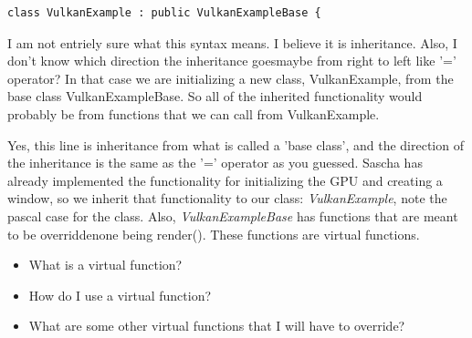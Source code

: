 \documentclass{article}
\begin{document}
\begin{verbatim}
class VulkanExample : public VulkanExampleBase {
\end{verbatim}
\begin{tcolorbox}[
  enhanced,
  breakable,
  colback=orange!5,
  colframe=orange!75!black,
  colbacktitle=orange!15,
  coltitle=black,
  fonttitle=\bfseries,
  sharp corners=all,
  boxrule=0.8pt,
  left=5pt,
  right=5pt,
  top=6pt,
  bottom=6pt
]
\par I am not entriely sure what this syntax means. I believe it is
inheritance. Also, I don't know which direction the inheritance
goes\textemdash maybe from right to left like '=' operator? In that
case we are initializing a new class, VulkanExample, from the base
class VulkanExampleBase. So all of the inherited functionality would
probably be from functions that we can call from VulkanExample.
\end{tcolorbox}

\begin{tcolorbox}[
  enhanced,
  breakable,
  colback=green!5,
  colframe=green!45!black,
  sharp corners=all,
  boxrule=0.8pt,
  left=5pt,
  right=5pt,
  top=6pt,
  bottom=6pt
]
\par Yes, this line is inheritance from what is called a 'base
class', and the direction of the inheritance is the same
as the '=' operator as you guessed. Sascha has already implemented
the functionality for initializing the GPU and creating a window, so
we inherit that functionality to our class: \textit{VulkanExample},
note the pascal case for the class. Also, \textit{VulkanExampleBase}
has functions that are meant to be overridden\textemdash one being
render(). These functions are virtual functions.
\end{tcolorbox}

\begin{tcolorbox}[
  enhanced,
  breakable,
  colback=blue!3,
  colframe=blue!60!black,
  sharp corners=all,
  boxrule=0.8pt,
  left=5pt,
  right=5pt,
  top=6pt,
  bottom=6pt
]
\begin{itemize}
  \item What is a virtual function?
  \item How do I use a virtual function?
  \item What are some other virtual functions that I will have to override?
\end{itemize}
\end{tcolorbox}
\end{document}
